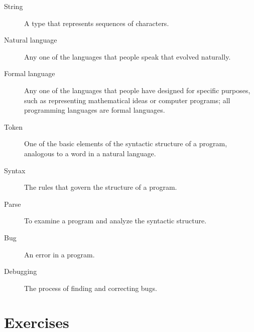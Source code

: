\begin{description}
\item[String] A type that represents sequences of characters.

\item[Natural language]  Any one of the languages that people speak that
evolved naturally.

\item[Formal language]  Any one of the languages that people have designed
for specific purposes, such as representing mathematical ideas or
computer programs; all programming languages are formal languages.

\item[Token]  One of the basic elements of the syntactic structure of
a program, analogous to a word in a natural language.

\item[Syntax] The rules that govern the structure of a program.

\item[Parse] To examine a program and analyze the syntactic structure.

\item[Bug] An error in a program.

\item[Debugging] The process of finding and correcting bugs.

\end{description}


\section{Exercises}

